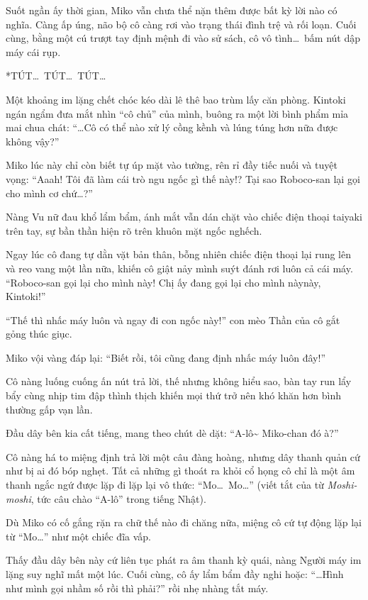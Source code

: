 \documentclass[../main.tex]{subfiles}
\begin{document}
Suốt ngần ấy thời gian, Miko vẫn chưa thể nặn thêm được bất kỳ lời nào có nghĩa. Càng ấp úng, não bộ cô càng rơi vào trạng thái đình trệ và rối loạn. Cuối cùng, bằng một cú trượt tay định mệnh đi vào sử sách, cô vô tình\dots\ bấm nút dập máy cái rụp.


*TÚT\dots\ TÚT\dots\ TÚT\dots*

Một khoảng im lặng chết chóc kéo dài lê thê bao trùm lấy căn phòng. Kintoki ngán ngẩm đưa mắt nhìn ``cô chủ'' của mình, buông ra một lời bình phẩm mỉa mai chua chát: ``\dots Cô có thể nào xử lý cồng kềnh và lúng túng hơn nữa được không vậy?''

Miko lúc này chỉ còn biết tự úp mặt vào tường, rên rỉ đầy tiếc nuối và tuyệt vọng: ``Aaah! Tôi đã làm cái trò ngu ngốc gì thế này!? Tại sao Roboco-san lại gọi cho mình cơ chứ\dots?''

Nàng Vu nữ đau khổ lẩm bẩm, ánh mắt vẫn dán chặt vào chiếc điện thoại taiyaki trên tay, sự bần thần hiện rõ trên khuôn mặt ngốc nghếch.

Ngay lúc cô đang tự dằn vặt bản thân, bỗng nhiên chiếc điện thoại lại rung lên và reo vang một lần nữa, khiến cô giật nảy mình suýt đánh rơi luôn cả cái máy. ``Roboco-san gọi lại cho mình này! Chị ấy đang gọi lại cho mình nàynày, Kintoki!''

``Thế thì nhấc máy luôn và ngay đi con ngốc này!'' con mèo Thần của cô gắt gỏng thúc giục.

Miko vội vàng đáp lại: ``Biết rồi, tôi cũng đang định nhấc máy luôn đây!''

Cô nàng luống cuống ấn nút trả lời, thế nhưng không hiểu sao, bàn tay run lẩy bẩy cùng nhịp tim đập thình thịch khiến mọi thứ trở nên khó khăn hơn bình thường gấp vạn lần.

Đầu dây bên kia cất tiếng, mang theo chút dè dặt: ``A-lô\~{} Miko-chan đó à?''

Cô nàng há to miệng định trả lời một câu đàng hoàng, nhưng dây thanh quản cứ như bị ai đó bóp nghẹt. Tất cả những gì thoát ra khỏi cổ họng cô chỉ là một âm thanh ngắc ngứ được lặp đi lặp lại vô thức: ``Mo\dots\ Mo\dots'' (viết tắt của từ \textit{Moshi-moshi}, tức câu chào ``A-lô'' trong tiếng Nhật).


Dù Miko có cố gắng rặn ra chữ thế nào đi chăng nữa, miệng cô cứ tự động lặp lại từ ``Mo\dots'' như một chiếc đĩa vấp.

Thấy đầu dây bên này cứ liên tục phát ra âm thanh kỳ quái, nàng Người máy im lặng suy nghĩ mất một lúc. Cuối cùng, cô ấy lẩm bẩm đầy nghi hoặc: ``\dots Hình như mình gọi nhầm số rồi thì phải?'' rồi nhẹ nhàng tắt máy.
\end{document}
